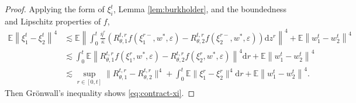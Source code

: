 \documentclass[11pt,letterpaper,reqno]{amsart}
\theoremstyle{definition}
\def\eps{\varepsilon}
\def\d{\mathrm{d}}
\def\E{\mathbb{E}}
\newcommand{\prn}[1]{\left({#1}\right)} %
\begin{document}
\begin{proof}
Applying the form of $\xi_i^t$, Lemma \ref{lem:burkholder}, and
the boundedness and Lipschitz properties of $f$,
\begin{align*}
\E\left\|\xi^t_1 - \xi^t_2\right\|^4 &\lesssim \E\left\|\int_0^t
\frac{\bar\eta^r}{\bar\kappa}
\prn{R_{\theta,1}^{t,r}f(\xi_1^{r-},w^*,\eps)-R_{\theta,2}^{t,r}f(\xi_2^{r-},w^*,\eps)}\d z^r\right\|^4 + \E\left\|w^t_1 - w^t_2\right\|^4\nonumber\\
  &\lesssim \int_0^t
\E\left\|R_{\theta,1}^{t,r}f(\xi_1^{r},w^*,\eps)-R_{\theta,2}^{t,r}f(\xi_2^r,w^*,\eps)\right\|^4 \d r+\E\left\|w^t_1 - w^t_2\right\|^4\\
&\lesssim \sup_{r \in [0,t]} \|R_{\theta,1}^{t,r}-R_{\theta,2}^{t,r}\|^4
+\int_0^t \E\|\xi_1^r-\xi_2^r\|^4\d r+\E\left\|w^t_1 - w^t_2\right\|^4.
\end{align*}
Then Gr\"onwall's inequality shows \eqref{eq:contract-xi}.


\end{proof}
\end{document}
